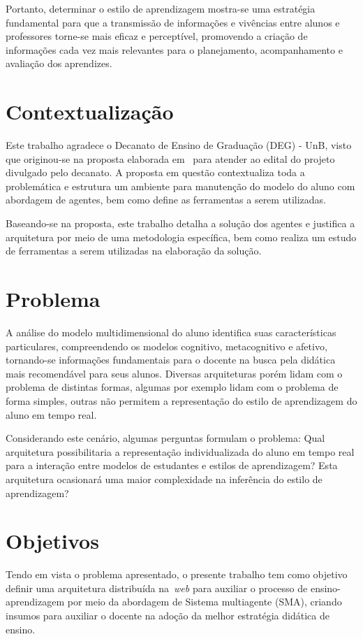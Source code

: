 Portanto, determinar o estilo de aprendizagem mostra-se uma estratégia fundamental para que a transmissão de informações e vivências entre alunos e professores torne-se mais eficaz e perceptível, promovendo a criação de informações cada vez mais relevantes para o planejamento, acompanhamento e avaliação dos aprendizes.

\section{Contextualização}
Este trabalho agradece o Decanato de Ensino de Graduação (DEG) - UnB, visto que originou-se na proposta elaborada em~\cite{editalFrank} para atender ao edital do projeto divulgado pelo decanato. A proposta em questão contextualiza toda a problemática e estrutura um ambiente para manutenção do modelo do aluno com abordagem de agentes, bem como define as ferramentas a serem utilizadas.

Baseando-se na proposta, este trabalho detalha a solução dos agentes e justifica a arquitetura por meio de uma metodologia específica, bem como realiza um estudo de ferramentas a serem utilizadas na elaboração da solução.

\section{Problema}
A análise do modelo multidimensional do aluno identifica suas características particulares, compreendendo os modelos cognitivo, metacognitivo e afetivo, tornando-se informações fundamentais para o docente na busca pela didática mais recomendável para seus alunos. Diversas arquiteturas porém lidam com o problema de distintas formas, algumas por exemplo lidam com o problema de forma simples, outras não permitem a representação do estilo de aprendizagem do aluno em tempo real.

Considerando este cenário, algumas perguntas formulam o problema: Qual arquitetura possibilitaria a representação individualizada do aluno em tempo real para a interação entre modelos de estudantes e estilos de aprendizagem? Esta arquitetura ocasionará uma maior complexidade na inferência do estilo de aprendizagem?

\section{Objetivos}
Tendo em vista o problema apresentado, o presente trabalho tem como objetivo definir uma arquitetura distribuída na~\emph{web} para auxiliar o processo de ensino-aprendizagem por meio da abordagem de Sistema multiagente (SMA), criando insumos para auxiliar o docente na adoção da melhor estratégia didática de ensino.

